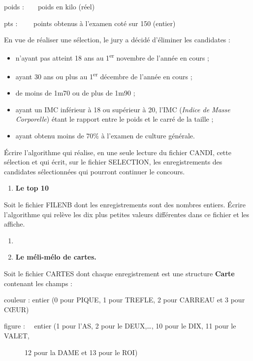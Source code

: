 {
poids :\ \ \ \ poids en kilo (réel)}

{
pts : \ \ \ \ points obtenus à l’examen coté sur 150 (entier)}

{
En vue de réaliser une sélection, le jury a décidé d’éliminer les
candidates :}

\liststyleListv
\begin{itemize}
\item {
n’ayant pas atteint 18 ans au 1\textsuperscript{er} novembre de l’année
en cours ;}
\item {
ayant 30 ans ou plus au 1\textsuperscript{er} décembre de l’année en
cours ;}
\item {
de moins de 1m70 ou de plus de 1m90 ;}
\item {
ayant un IMC inférieur à 18 ou supérieur à 20, l’IMC (\textit{Indice de
Masse Corporelle}) étant le rapport entre le poids et le carré de la
taille ;}
\item {
ayant obtenu moins de 70\% à l’examen de culture générale.}
\end{itemize}
{
Écrire l’algorithme qui réalise, en une seule lecture du fichier CANDI,
cette sélection et qui écrit, sur le fichier SELECTION, les
enregistrements des candidates sélectionnées qui pourront continuer le
concours.}

\liststyleExercice
\begin{enumerate}
\item {\sffamily\bfseries
Le top 10}
\end{enumerate}
{
{Soit le fichier FILENB dont les enregistrements
sont des nombres entiers. Écrire} l’algorithme qui relève les dix plus
petites valeurs différentes dans ce fichier et les affiche.}

\liststyleExercice
\setcounter{saveenum}{\value{enumi}}
\begin{enumerate}
\setcounter{enumi}{\value{saveenum}}
\item[] 
\bigskip
\item {\sffamily\bfseries
{Le méli-mélo de
cartes}{. }}
\end{enumerate}
{
{Soit le fichier CARTES dont chaque
enregistrement est une structure
}{\textbf{Carte}}{
contenant les champs :}}

{
couleur : entier (0 pour PIQUE, 1 pour TREFLE, 2 pour CARREAU et 3 pour
CŒUR)~}

{
figure : \ \ entier (1 pour l’AS, 2 pour le DEUX,…, 10 pour le DIX, 11
pour le VALET,}

{
\ \ \ \ \ \ 12 pour la DAME et 13 pour le ROI)}

